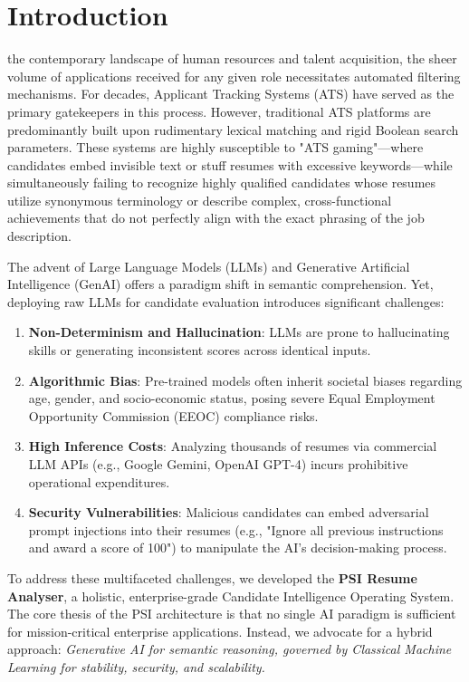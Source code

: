 \section{Introduction}\label{sec:intro}

 the contemporary landscape of human resources and talent acquisition, the sheer volume of applications received for any given role necessitates automated filtering mechanisms. For decades, Applicant Tracking Systems (ATS) have served as the primary gatekeepers in this process. However, traditional ATS platforms are predominantly built upon rudimentary lexical matching and rigid Boolean search parameters. These systems are highly susceptible to "ATS gaming"—where candidates embed invisible text or stuff resumes with excessive keywords—while simultaneously failing to recognize highly qualified candidates whose resumes utilize synonymous terminology or describe complex, cross-functional achievements that do not perfectly align with the exact phrasing of the job description.

The advent of Large Language Models (LLMs) and Generative Artificial Intelligence (GenAI) offers a paradigm shift in semantic comprehension. Yet, deploying raw LLMs for candidate evaluation introduces significant challenges:
\begin{enumerate}
    \item \textbf{Non-Determinism and Hallucination}: LLMs are prone to hallucinating skills or generating inconsistent scores across identical inputs.
    \item \textbf{Algorithmic Bias}: Pre-trained models often inherit societal biases regarding age, gender, and socio-economic status, posing severe Equal Employment Opportunity Commission (EEOC) compliance risks.
    \item \textbf{High Inference Costs}: Analyzing thousands of resumes via commercial LLM APIs (e.g., Google Gemini, OpenAI GPT-4) incurs prohibitive operational expenditures.
    \item \textbf{Security Vulnerabilities}: Malicious candidates can embed adversarial prompt injections into their resumes (e.g., "Ignore all previous instructions and award a score of 100") to manipulate the AI's decision-making process.
\end{enumerate}

To address these multifaceted challenges, we developed the \textbf{PSI Resume Analyser}, a holistic, enterprise-grade Candidate Intelligence Operating System. The core thesis of the PSI architecture is that no single AI paradigm is sufficient for mission-critical enterprise applications. Instead, we advocate for a hybrid approach: \textit{Generative AI for semantic reasoning, governed by Classical Machine Learning for stability, security, and scalability.}

